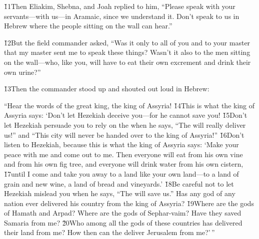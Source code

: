 \v{11}Then Eliakim, Shebna, and Joah replied to him, ``Please speak with your servants---with us---in Aramaic, since we understand it. Don't speak to us in Hebrew where the people sitting on the wall can hear.''

\v{12}But the field commander asked, ``Was it only to all of you and to your master that my master sent me to speak these things? Wasn't it also to the men sitting on the wall---who, like you, will have to eat their own excrement and drink their own urine?''

\v{13}Then the commander stood up and shouted out loud in Hebrew:

\begin{poetry}
\poeml ``Hear the words of the great king, the king of Assyria! \v{14}This is what the king of Assyria says: `Don't let Hezekiah deceive you---for he cannot save you! \v{15}Don't let Hezekiah persuade you to rely on the  when he says, ``The  will really deliver us!'' and ``This city will never be handed over to the king of Assyria!'' \v{16}Don't listen to Hezekiah, because this is what the king of Assyria says: `Make your peace with me and come out to me. Then everyone will eat from his own vine and from his own fig tree, and everyone will drink water from his own cistern, \v{17}until I come and take you away to a land like your own land---to a land of grain and new wine, a land of bread and vineyards.' \v{18}Be careful not to let Hezekiah mislead you when he says, ``The  will save us.'' Has any god of any nation ever delivered his country from the king of Assyria? \v{19}Where are the gods of Hamath and Arpad? Where are the gods of Sephar-vaim? Have they saved Samaria from me? \v{20}Who among all the gods of these countries has delivered their land from me? How then can the  deliver Jerusalem from me?'\,''
\end{poetry}

